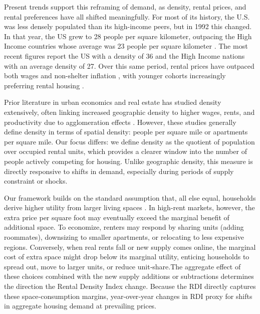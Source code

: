 \documentclass[APA,Times1COL]{WileyNJDv5} %
\begin{document}
Present trends support this reframing of demand, as density, rental prices, and rental preferences have all shifted meaningfully. For most of its history, the U.S. was less densely populated than its high-income peers, but in 1992 this changed. In that year, the US grew to 28 people per square kilometer, outpacing the High Income countries whose average was 23 people per square kilometer \cite{worldbankPopDensity}. The most recent figures report the US with a density of 36 and the High Income nations with an average density of 27.  Over this same period, rental prices have outpaced both wages and non-shelter inflation \cite{feiveson2024rent, stlouisfedConsumerPrice}, with younger cohorts increasingly preferring rental housing \cite{fanniemaeConsumersFeeling}.

Prior literature in urban economics and real estate has studied density extensively, often linking increased geographic density to higher wages, rents, and productivity due to agglomeration effects \cite{titman2024city, liu2018vertical}. However, these studies generally define density in terms of spatial density: people per square mile or  apartments per square mile. Our focus differs: we define density as the quotient of population over occupied rental units, which provides a clearer window into the number of people actively competing for housing. Unlike geographic density, this measure is directly responsive to shifts in demand, especially during periods of supply constraint or shocks. 

Our framework builds on the standard assumption that, all else equal, households derive higher utility from larger living spaces \cite{muth1969cities,molloy2022housing}. In high-rent markets, however, the extra price per square foot may eventually exceed the marginal benefit of additional space. To economize, renters may respond by sharing units (adding roommates), downsizing to smaller apartments, or relocating to less expensive regions. Conversely, when real rents fall or new supply comes online, the marginal cost of extra space might drop below its marginal utility, enticing households to spread out, move to larger units, or reduce unit‐share.The aggregate effect of these choices combined with the new supply additions or subtractions determines the direction the Rental Density Index change. Because the RDI directly captures these space‐consumption margins, year‐over‐year changes in RDI proxy for shifts in aggregate housing demand at prevailing prices.
\end{document}
